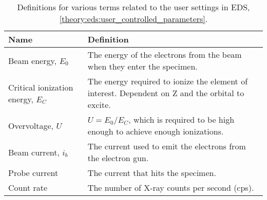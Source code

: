 \begin{table}[pht]
    \begin{center}
        \caption{
            Definitions for various terms related to the user settings in EDS, \cref{theory:eds:user_controlled_parameters}.
        }
        \renewcommand*{\arraystretch}{1.4}
        \label{tab:eds:userparameters}
        \begin{tabular}{p{2.6cm}p{12cm}}
            \hline
            \textbf{Name}                     & \textbf{Definition}                                                                                                                                                                                                        \\
            \hline
            Beam energy, $E_0$                & The energy of the electrons from the beam when they enter the specimen.                                                                                                                                                    \\
            Critical ionization energy, $E_C$ & The energy required to ionize the element of interest. Dependent on Z and the orbital to excite.                                                                                                                           \\
            Overvoltage, $U$                  & $ U = E_0 / E_C $, which is required to be high enough to achieve enough ionizations.                                                                                                                                      \\
            Beam current, $i_b$               & The current used to emit the electrons from the electron gun.                                                                                                                                                              \\
            Probe current                     & The current that hits the specimen.                                                                                                                                                                                        \\
            Count rate                        & The number of X-ray counts per second (cps).                                                                                                                                                                               \\

\end{tabular}
\end{center}
\end{table}
